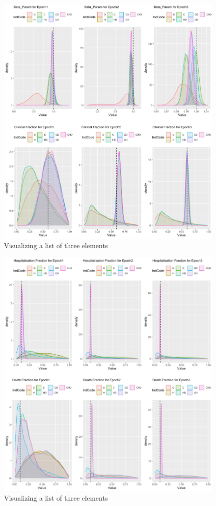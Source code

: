 \documentclass[10pt,letterpaper]{article}
\begin{document}
\begin{figure}
\includegraphics[width=1\linewidth]{diagrams/exp_density_b_cf} \caption{Visualizing a list of three elements}\label{fig:exp-density-1}
\end{figure}

\begin{figure}
\includegraphics[width=1\linewidth]{diagrams/exp_density_hf_df} \caption{Visualizing a list of three elements}\label{fig:exp-density-2}
\end{figure}
\end{document}
